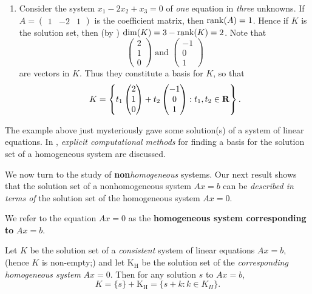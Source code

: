 \begin{example}
\begin{enumerate}
\item Consider the system \(x_1 - 2x_2 + x_3 = 0\) of \emph{one} equation in \emph{three} unknowns.
If \(A = \begin{pmatrix} 1 & -2 & 1 \end{pmatrix}\) is the coefficient matrix, then \(\mathrm{rank}(A) = 1\).
Hence if \(K\) is the solution set, then (by ) \(\dim(K) = 3 - \mathrm{rank}(K) = 2\).
Note that
\[
    \begin{pmatrix} 2 \\ 1 \\ 0 \end{pmatrix}
    \text{ and }
    \begin{pmatrix} -1 \\ 0 \\ 1 \end{pmatrix}
\]
are \LID{} vectors in \(K\).
Thus they constitute a basis for \(K\), so that
\[
    K = \left\{
        t_1 \begin{pmatrix} 2 \\ 1 \\ 0 \end{pmatrix}
        + t_2 \begin{pmatrix} -1 \\ 0 \\ 1 \end{pmatrix}
        : t_1, t_2 \in \mathbf{R} \right\}.
\]
\end{enumerate}
\end{example}

\begin{note}
The example above just mysteriously gave some solution(s) of a system of linear equations.
In , \emph{explicit computational methods} for finding a basis for the solution set of a homogeneous system are discussed.
\end{note}

We now turn to the study of \textbf{non}\emph{homogeneous} systems.
Our next result shows that the solution set of a nonhomogeneous system \(Ax = b\) can be \emph{described in terms of} the solution set of the homogeneous system \(Ax = 0\).

\begin{additional definition} \label{adef 3.2}
We refer to the equation \(Ax = 0\) as the \textbf{homogeneous system corresponding to} \(Ax = b\).
\end{additional definition}

\begin{theorem} \label{thm 3.9}
Let \(K\) be the solution set of a \emph{consistent} system of linear equations \(Ax = b\), (hence \(K\) is non-empty;)
and let \(\mathrm{K_H}\) be the solution set of the \emph{corresponding homogeneous system} \(Ax = 0\).
Then for any solution \(s\) to \(Ax = b\),
\[
    K = \{ s \} + \mathrm{K_H} = \{ s + k : k \in K_H \}.
\]
\end{theorem}

